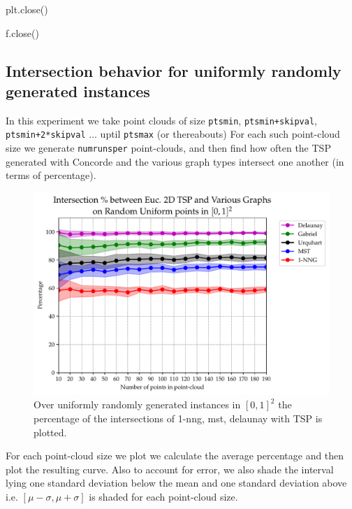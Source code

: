               plt.close()

     f.close()
\nwendcode{}\nwdocspar




\subsection{Intersection behavior for uniformly randomly generated instances}



In this experiment we take point clouds of size \verb|ptsmin|, \verb|ptsmin+skipval|, \verb|ptsmin+2*skipval| $\ldots$ uptil \verb|ptsmax| (or thereabouts) 
For each such point-cloud  size we generate \verb|numrunsper| point-clouds, and then find how often the 
TSP generated with Concorde and the various graph types intersect one another (in terms of percentage).

\begin{figure}[ht]
  \centering
  \includegraphics[width=18cm]{./exptimages/expt_intersection_behavior.pdf}
  \caption{\label{fig:interscn} Over uniformly randomly generated instances in $[0,1]^2$ the percentage of the intersections of 1-nng, mst, delaunay with TSP is plotted. }
\end{figure}

For each point-cloud size we plot we calculate the average percentage and then plot the resulting 
curve. Also to account for error, we also shade the interval lying one standard deviation below the mean 
and one standard deviation above i.e. $[\mu-\sigma, \mu+\sigma]$ is shaded for each point-cloud size. 


